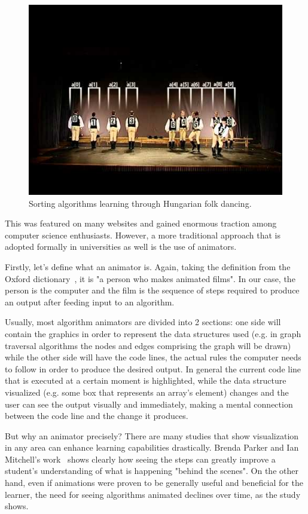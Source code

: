 \documentclass{l4proj}
\begin{document}
\begin{figure}[!ht]
\centering
\includegraphics[scale=0.6]{quicksort}
\caption{Sorting algorithms learning through Hungarian folk dancing.}
\label{fig:quicksort}
\end{figure}

This was featured on many websites and gained enormous traction among computer science enthusiasts. However, a more traditional approach that is adopted formally in universities as well is the use of animators.

Firstly, let's define what an animator is. Again, taking the definition from the Oxford dictionary~\cite{oxford-dict}, it is "a person who makes animated films". In our case, the person is the computer and the film is the sequence of steps required to produce an output after feeding input to an algorithm.

Usually, most algorithm animators are divided into 2 sections: one side will contain the graphics in order to represent the data structures used (e.g. in graph traversal algorithms the nodes and edges comprising the graph will be drawn) while the other side will have the code lines, the actual rules the computer needs to follow in order to produce the desired output. In general the current code line that is executed at a certain moment is highlighted, while the data structure visualized (e.g. some box that represents an array's element) changes and the user can see the output visually and immediately, making a mental connection between the code line and the change it produces.

But why an animator precisely? There are many studies that show visualization in any area can enhance learning capabilities drastically. Brenda Parker and Ian Mitchell's work~\cite{parker-mitchell} shows clearly how seeing the steps can greatly improve a student's understanding of what is happening "behind the scenes". On the other hand, even if animations were proven to be generally useful and beneficial for the learner, the need for seeing algorithms animated declines over time, as the study shows.
\end{document}
